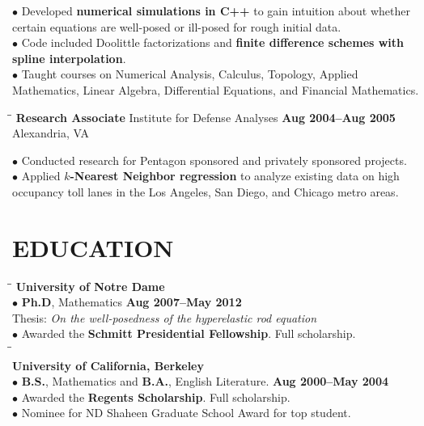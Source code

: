 \documentclass{resume}
\begin{document}
\begin{resume}
$\bullet$ Developed \textbf{numerical simulations in C++}  to gain
intuition about whether certain  equations are well-posed
or ill-posed for rough initial data. \\
$\bullet$ Code included Doolittle factorizations and \textbf{finite
difference schemes with spline interpolation}. \\
$\bullet$ Taught courses on Numerical Analysis, Calculus,
Topology, Applied Mathematics, Linear Algebra,
Differential Equations, and Financial Mathematics.
\begin{tabbing}
\hspace{2.3in}\= \hspace{2.6in}\= \kill
{\bf Research Associate } \> Institute for
Defense Analyses \>  
\textbf{Aug 2004--Aug 2005}\\
    \>Alexandria, VA
\end{tabbing}
$\bullet$ Conducted research for Pentagon sponsored and privately
sponsored projects. 
\\ 
$\bullet$ Applied \textbf{$k$-Nearest Neighbor regression} to analyze existing data on high
occupancy toll lanes in the Los
Angeles, San Diego, and
Chicago metro areas.
\newpage
\section{EDUCATION} 
\vspace{-0.05mm}
\begin{tabbing}
\hspace{2.3in}\= \hspace{2.6in}\= \kill
\textbf{University of Notre Dame} \\
$\bullet$ \textbf{Ph.D}, Mathematics \>\>\textbf{Aug 2007--May 2012}
\\ 
Thesis: \textit{On the well-posedness of the hyperelastic rod equation} \\
$\bullet$ Awarded the \textbf{Schmitt Presidential Fellowship}. Full scholarship. \\
\hspace{2.3in}\= \hspace{2.6in}\= \kill
\\
\textbf{University of California, Berkeley}
\\
$\bullet$ \textbf{B.S.}, Mathematics  and  \textbf{B.A.}, English Literature.
\>\>\textbf{Aug 2000--May 2004}
\\
$\bullet$ Awarded the \textbf{Regents Scholarship}. Full scholarship.
\\
$\bullet$ Nominee for ND Shaheen Graduate School Award for top student.
\end{tabbing}

\end{resume}
\end{document}

